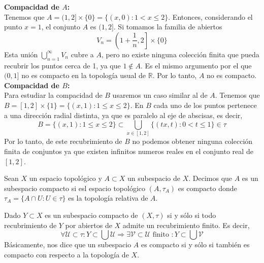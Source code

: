 {    \textbf{Compacidad de $A$:} \\
    Tenemos que $A = (1,2] \times \{0\} = \{(x,0) : 1 < x \leq 2\}$. Entonces, considerando el punto $x = 1$, el conjunto $A$ es $(1,2]$. Si tomamos la familia de abiertos
    $$V_n = \left(1 + \frac{1}{n}, 2\right] \times \{0\}$$
    Esta unión $\bigcup_{n=1}^{\infty} V_n$ cubre a $A$, pero no existe ninguna colección finita que pueda recubrir los puntos cerca de 1, ya que $1 \notin A$. Es el mismo argumento por el que $(0,1]$ no es compacto en la topología usual de $\mathbb{R}$. Por lo tanto, $A$ no es compacto.\\


    \textbf{Compacidad de $B$:} \\
    Para estudiar la compacidad de $B$ usaremos un caso similar al de $A$. Tenemos que $B = [1,2] \times \{1\} = \{(x,1) : 1 \leq x \leq 2\}$. En $B$ cada uno de los puntos pertenece a una dirección radial distinta, ya que es paralelo al eje de abscisas, es decir, 
    $$B = \{(x,1) : 1 \leq x \leq 2\} \subset \bigcup_{x \in [1,2]} \{(tx, t) : 0 < t \leq 1\} \in \tau$$
    Por lo tanto, de este recubrimiento de $B$ no podemos obtener ninguna colección finita de conjuntos ya que existen infinitos numeros reales en el conjunto real de $[1,2]$. 
}
\begin{definición}
    Sean $X$ un espacio topológico y $A \subset X$ un subespacio de $X$. Decimos que $A$ es un subespacio compacto si esl espacio topológico $(A, \tau_A)$ es compacto donde $\tau_A = \{A \cap U : U \in \tau\}$ es la topología relativa de $A$.
\end{definición}
\begin{proposición}
    Dado $Y \subset X$ es un subespacio compacto de $(X, \tau)$ si y sólo si todo recubrimiento de $Y$ por abiertos de $X$ admite un recubrimiento finito. Es decir,
    $$\forall \mathcal{U} \subset \tau : Y \subset \bigcup \mathcal{U} \Rightarrow \exists \mathcal{V} \subset \mathcal{U} \text{ finito } : Y \subset \bigcup \mathcal{V}$$
    Básicamente, nos dice que un subespacio $A$ es compacto si y sólo si también es compacto con respecto a la topología de $X$.
\end{proposición}
